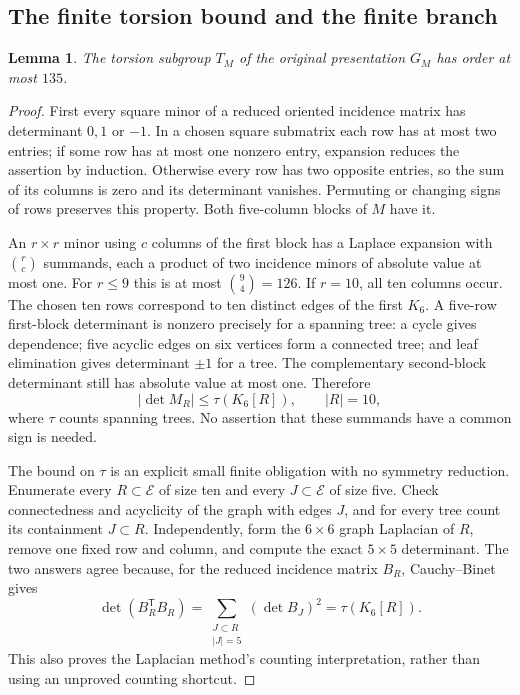\documentclass[11pt]{article}
\newtheorem{lemma}[theorem]{Lemma}
\theoremstyle{remark}
\begin{document}
\subsection{The finite torsion bound and the finite branch}
\begin{lemma}\label{lem:bound}
The torsion subgroup $T_M$ of the original presentation $G_M$ has order
at most $135$.
\end{lemma}
\begin{proof}
First every square minor of a reduced oriented incidence matrix has
determinant $0,1$ or $-1$. In a chosen square submatrix each row has
at most two entries; if some row has at most one nonzero entry, expansion
reduces the assertion by induction. Otherwise every row has two opposite
entries, so the sum of its columns is zero and its determinant vanishes.
Permuting or changing signs of rows preserves this property. Both
five-column blocks of $M$ have it.

An $r\times r$ minor using $c$ columns of the first block has a Laplace
expansion with $\binom rc$ summands, each a product of two incidence
minors of absolute value at most one. For $r\le9$ this is at most
$\binom94=126$. If $r=10$, all ten columns occur. The chosen ten rows
correspond to ten distinct edges of the first $K_6$. A five-row
first-block determinant is nonzero precisely for a spanning tree:
a cycle gives dependence; five acyclic edges on six vertices form a
connected tree; and leaf elimination gives determinant $\pm1$ for a
tree. The complementary second-block determinant still has absolute
value at most one. Therefore
\[
 |\det M_R|\le\tau(K_6[R]),\qquad |R|=10,
\]
where $\tau$ counts spanning trees. No assertion that these summands
have a common sign is needed.

The bound on $\tau$ is an explicit small finite obligation with no
symmetry reduction. Enumerate every $R\subset\mathcal E$ of size ten
and every $J\subset\mathcal E$ of size five. Check connectedness and
acyclicity of the graph with edges $J$, and for every tree count its
containment $J\subset R$. Independently, form the $6\times6$ graph
Laplacian of $R$, remove one fixed row and column, and compute the exact
$5\times5$ determinant. The two answers agree because, for the reduced
incidence matrix $B_R$, Cauchy--Binet gives
\[
 \det(B_R^{\mathsf T}B_R)
   =\sum_{\substack{J\subset R\\|J|=5}}(\det B_J)^2
   =\tau(K_6[R]).
\]
This also proves the Laplacian method's counting interpretation, rather
than using an unproved counting shortcut.


\end{proof}
\end{document}

